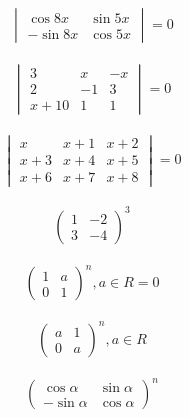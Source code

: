 \documentclass[a4paper, 11pt, oneside]{article}
\begin{document}
\begin{gather*}
	\begin{vmatrix}
		\cos 8x& \sin 5x\\
		-\sin 8x& \cos 5x
	\end{vmatrix}
	=0
\end{gather*}

\begin{gather*}
	\begin{vmatrix}
		3& x& -x\\
		2& -1& 3\\
		x+10& 1& 1
	\end{vmatrix}
	=0
\end{gather*}

\begin{gather*}
	\begin{vmatrix}
		x& x+1& x+2\\
		x+3& x+4& x+5\\
		x+6& x+7& x+8
	\end{vmatrix}
	=0
\end{gather*}

\begin{gather*}
	\begin{pmatrix}
		1& -2\\
		3& -4
	\end{pmatrix}^3
\end{gather*}

\begin{gather*}
	\begin{pmatrix}
		1& a\\
		0& 1
	\end{pmatrix}^n, a \in R
	=0
\end{gather*}

\begin{gather*}
	\begin{pmatrix}
		a& 1\\
		0& a
	\end{pmatrix}^n, a \in R
\end{gather*}

\begin{gather*}
	\begin{pmatrix}
		\cos \alpha &  \sin \alpha\\
		-\sin \alpha &  \cos \alpha
	\end{pmatrix}^n
\end{gather*}
\end{document}
